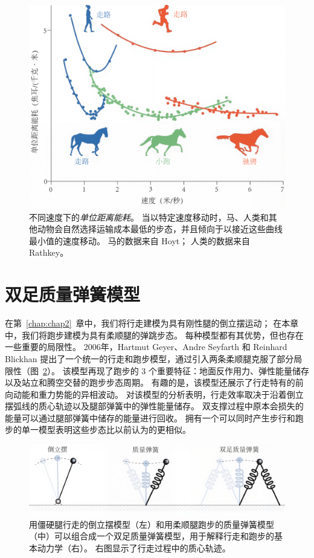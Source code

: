 \begin{figure}[!htb]
	\centering
	\includegraphics[width=0.85\linewidth]{chap3/3_18}
	\caption{不同速度下的\textit{单位距离能耗}。
		当以特定速度移动时，马、人类和其他动物会自然选择运输成本最低的步态，并且倾​​向于以接近这些曲线最小值的速度移动。
		马的数据来自 Hoyt\cite{hoyt1981gait}；
		人类的数据来自 Rathkey\cite{rathkey2017people}。 \label{fig:3_18}}
\end{figure}


\section{双足质量弹簧模型}

在第~\ref{chap:chap2}~章中，我们将行走建模为具有刚性腿的倒立摆运动；
在本章中，我们将跑步建模为具有柔顺腿的弹跳步态。
每种模型都有其优势，但也存在一些重要的局限性。
2006年，Hartmut Geyer、Andre Seyfarth 和 Reinhard Blickhan 提出了一个统一的行走和跑步模型，通过引入两条柔顺腿克服了部分局限性（图~\ref{fig:3_19}）。
该模型再现了跑步的 3 个重要特征：地面反作用力、弹性能量储存以及站立和腾空交替的跑步步态周期。
有趣的是，该模型还展示了行走特有的前向动能和重力势能的异相波动。
对该模型的分析表明，行走效率取决于沿着倒立摆弧线的质心轨迹以及腿部弹簧中的弹性能量储存。
双支撑过程中原本会损失的能量可以通过腿部弹簧中储存的能量进行回收。
拥有一个可以同时产生步行和跑步的单一模型表明这些步态比以前认为的更相似。

\begin{figure}[!htb]
	\centering
	\includegraphics[width=1.0\linewidth]{chap3/3_19}
	\caption{用僵硬腿行走的倒立摆模型（左）和用柔顺腿跑步的质量弹簧模型（中）可以组合成一个双足质量弹簧模型，用于解释行走和跑步的基本动力学（右）。
		右图显示了行走过程中的质心轨迹\cite{geyer2006compliant}。 \label{fig:3_19}}
\end{figure}


